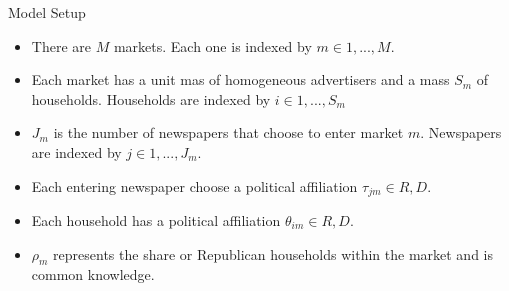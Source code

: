 \documentclass{beamer}
\begin{document}
\begin{frame}[t]{Model Setup}
  \begin{itemize}
    \item There are $M$ markets. Each one is indexed by $m \in {1,...,M}$.
    \item Each market has a unit mas of homogeneous advertisers and a mass
      $S_m$ of households. Households are indexed by $i \in {1,...,S_m}$
    \item $J_m$ is the number of newspapers that choose to enter market $m$.
      Newspapers are indexed by $j \in {1,...,J_m}$.
    \item Each entering newspaper choose a political affiliation 
      $\tau_{jm} \in {R,D}.$
    \item Each household has a political affiliation $\theta_{im} \in {R, D}$.
    \item $\rho_m$ represents the share or Republican households within the 
      market and is common knowledge.
  \end{itemize}
\end{frame}
\end{document}
